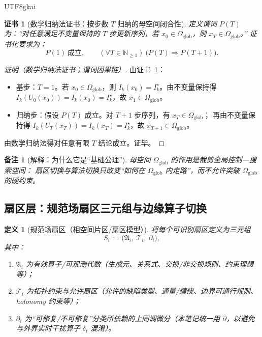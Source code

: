 \documentclass[12pt]{article}
\newtheorem{definition}{定义}[section]
\newtheorem{remark}{备注}[section]
\newtheorem{Certificate}{证书}[section]
\newcommand{\NN}{\mathbb{N}}
\begin{document}
\begin{CJK*}{UTF8}{gkai}
\begin{Certificate}[数学归纳法证书：按步数 $T$ 归纳的母空间闭合性]
\label{cert:global-feasible-space-invariant}
定义谓词 $P(T)$ 为：“对任意满足不变量保持的 $T$ 步更新序列，若 $x_0\in\Omega_{\mathrm{glob}}$，则 $x_T\in\Omega_{\mathrm{glob}}$。”
证书化要求为：
\[
  P(1)\ \text{成立},\qquad
  (\forall T\in\NN_{\ge 1})\ \bigl(P(T)\Rightarrow P(T+1)\bigr).
\]
\end{Certificate}

\begin{proof}[证明（数学归纳法证书；谓词因果链）]
由证书~\ref{cert:global-feasible-space-invariant}：
\begin{itemize}
  \item 基步：$T=1$。若 $x_0\in\Omega_{\mathrm{glob}}$，则 $I_k(x_0)=I_k^\star$。由不变量保持得 $I_k(U_0(x_0))=I_k(x_0)=I_k^\star$，故
    $x_1\in\Omega_{\mathrm{glob}}$。
  \item 归纳步：假设 $P(T)$ 成立。对 $T+1$ 步序列，有 $x_T\in\Omega_{\mathrm{glob}}$；
  再由不变量保持得 $I_k(U_T(x_T))=I_k(x_T)=I_k^\star$，故 $x_{T+1}\in\Omega_{\mathrm{glob}}$。
\end{itemize}
由数学归纳法得对任意有限 $T$ 结论成立。证毕。
\end{proof}

\begin{remark}[解释：为什么它是“基础公理”]
母空间 $\Omega_{\mathrm{glob}}$ 的作用是裁剪全局控制—搜索空间：
扇区切换与算法切换只改变“如何在 $\Omega_{\mathrm{glob}}$ 内走路”，而不允许突破 $\Omega_{\mathrm{glob}}$ 的硬约束。
\end{remark}

\subsection{扇区层：规范场扇区三元组与边缘算子切换}
\label{sec:sector-layer-sector-triple}

\begin{definition}[规范场扇区（相空间片区/扇区模型）]
将每个可识别扇区定义为三元组
\[
  S_i := \bigl(\mathfrak{A}_i,\ \mathcal{T}_i,\ \partial_i\bigr),
\]
其中：
\begin{enumerate}
  \item $\mathfrak{A}_i$ 为有效算子/可观测代数（生成元、关系式、交换/非交换规则、约束理想等）；
  \item $\mathcal{T}_i$ 为拓扑约束与允许扇区（允许的缺陷类型、通量/缠绕、边界可通行规则、holonomy 约束等）；
  \item $\partial_i$ 为“可修复/不可修复”分类所依赖的上同调微分（本笔记统一用 $\partial$，以避免与外界实时干扰算子 $\delta_t$ 混淆）。
\end{enumerate}
\end{definition}


\end{CJK*}
\end{document}
